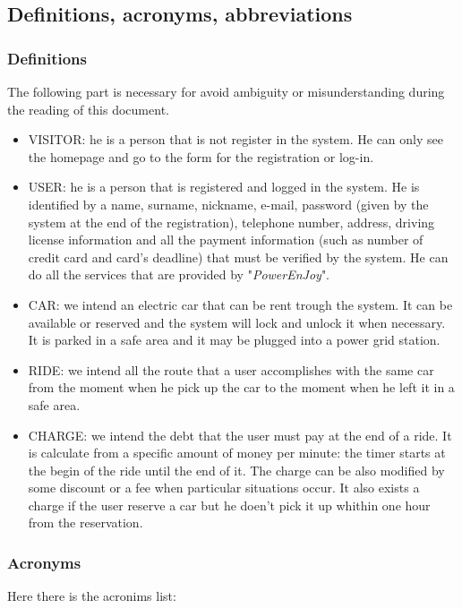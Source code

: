 \subsection{Definitions, acronyms, abbreviations} \label{subsec:def-ac-ab}

\subsubsection{Definitions} \label{def}
The following part is necessary for avoid ambiguity or misunderstanding during the reading of this document. 
\begin{itemize}
\item VISITOR: he is a person that is not register in the system. He can only see the homepage and go to the form for the registration or log-in.
\item USER: he is a person that is registered and logged in the system. He is identified by a name, surname, nickname, e-mail, password (given by the system at the end of the registration), telephone number, address, driving license information and all the payment information (such as number of credit card and card's deadline) that must be verified by the system. He can do all the services that are provided by "\emph{PowerEnJoy}".
\item CAR: we intend an electric car that can be rent trough the system. It can be available or reserved and the system will lock and unlock it when necessary. It is parked in a safe area and it may be plugged into a power grid station.
\item RIDE: we intend all the route that a user accomplishes with the same car from the moment when he pick up the car to the moment when he left it in a safe area.   
\item CHARGE: we intend the debt that the user must pay at the end of a ride. It is calculate from a specific amount of money per minute: the timer starts at the begin of the ride until the end of it. The charge can be also modified by some discount or a fee when particular situations occur. It also exists a charge if the user reserve a car but he doen't pick it up whithin one hour from the reservation.  

\end{itemize}

\subsubsection{Acronyms} \label{acr}
Here there is the acronims list:

